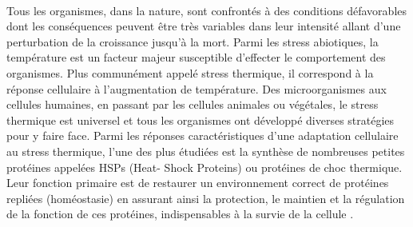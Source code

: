 

\paragraph*{} %
\label{par:intro1}

Tous les organismes, dans la nature, sont confrontés à des conditions défavorables dont les conséquences peuvent être très variables dans leur intensité allant d'une perturbation de la croissance jusqu'à la mort.
Parmi les stress abiotiques, la température est un facteur majeur susceptible d'effecter le comportement des organismes.
Plus communément appelé stress thermique, il correspond à la réponse cellulaire à l'augmentation de température.
Des microorganismes aux cellules humaines, en passant par les cellules animales ou végétales, le stress thermique est universel et tous les organismes ont développé diverses stratégies pour y faire face.
Parmi les réponses caractéristiques d'une adaptation cellulaire au stress thermique, l'une des plus étudiées est la synthèse de nombreuses petites protéines appelées HSPs (Heat- Shock Proteins) ou protéines de choc thermique.
Leur fonction primaire est de restaurer un environnement correct de protéines repliées (homéostasie) en assurant ainsi la protection, le maintien et la régulation de la fonction de ces protéines, indispensables à la  survie de la cellule \cite{lindquist1988}.



